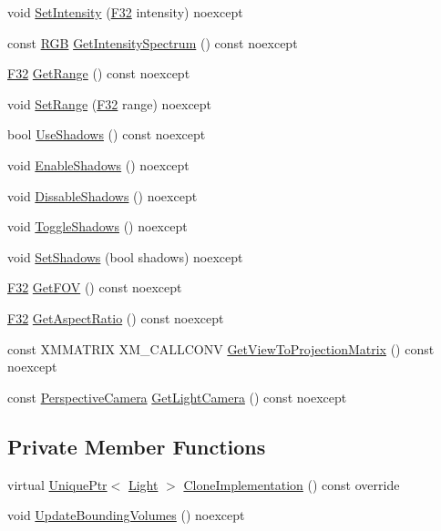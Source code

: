 \begin{DoxyCompactItemize}
void \hyperlink{classmage_1_1_omni_light_add3fece8f288f4d4b55357143faa490b}{Set\+Intensity} (\hyperlink{namespacemage_aa97e833b45f06d60a0a9c4fc22ae02c0}{F32} intensity) noexcept
\item 
const \hyperlink{structmage_1_1_r_g_b}{R\+GB} \hyperlink{classmage_1_1_omni_light_a89ce7086bd33e1d419dbd755316daf2e}{Get\+Intensity\+Spectrum} () const noexcept
\item 
\hyperlink{namespacemage_aa97e833b45f06d60a0a9c4fc22ae02c0}{F32} \hyperlink{classmage_1_1_omni_light_a1c829777c2afc850dd66382bc0115d8d}{Get\+Range} () const noexcept
\item 
void \hyperlink{classmage_1_1_omni_light_a696ec6a022ccc3993d88c1d435938fb1}{Set\+Range} (\hyperlink{namespacemage_aa97e833b45f06d60a0a9c4fc22ae02c0}{F32} range) noexcept
\item 
bool \hyperlink{classmage_1_1_omni_light_a8d58e7e1b26e54b3d9785ca79213cc4f}{Use\+Shadows} () const noexcept
\item 
void \hyperlink{classmage_1_1_omni_light_ad7c2e780dc83eb63fa44e1475492e192}{Enable\+Shadows} () noexcept
\item 
void \hyperlink{classmage_1_1_omni_light_a2353a53e336ffb55be9949ea6f1d8979}{Dissable\+Shadows} () noexcept
\item 
void \hyperlink{classmage_1_1_omni_light_a19164a13e884bce6fbc80b760c82d243}{Toggle\+Shadows} () noexcept
\item 
void \hyperlink{classmage_1_1_omni_light_a337082a4e6026fe6f98098df063e6660}{Set\+Shadows} (bool shadows) noexcept
\item 
\hyperlink{namespacemage_aa97e833b45f06d60a0a9c4fc22ae02c0}{F32} \hyperlink{classmage_1_1_omni_light_a7a0bd82c0272a7eeeb33a9ede796bae1}{Get\+F\+OV} () const noexcept
\item 
\hyperlink{namespacemage_aa97e833b45f06d60a0a9c4fc22ae02c0}{F32} \hyperlink{classmage_1_1_omni_light_a976a37c3f7c160f0383a93e4f7497eed}{Get\+Aspect\+Ratio} () const noexcept
\item 
const X\+M\+M\+A\+T\+R\+IX X\+M\+\_\+\+C\+A\+L\+L\+C\+O\+NV \hyperlink{classmage_1_1_omni_light_abae044c80634cfc6d15a0e21e7a55b5d}{Get\+View\+To\+Projection\+Matrix} () const noexcept
\item 
const \hyperlink{classmage_1_1_perspective_camera}{Perspective\+Camera} \hyperlink{classmage_1_1_omni_light_ac31708d7696a809bb75c75a85b14de80}{Get\+Light\+Camera} () const noexcept
\end{DoxyCompactItemize}
\subsection*{Private Member Functions}
\begin{DoxyCompactItemize}
\item 
virtual \hyperlink{namespacemage_a3316d7143a973e37adf1110f2e80ca31}{Unique\+Ptr}$<$ \hyperlink{classmage_1_1_light}{Light} $>$ \hyperlink{classmage_1_1_omni_light_a1212457828cdd96cc7170767b7bd1223}{Clone\+Implementation} () const override
\item 
void \hyperlink{classmage_1_1_omni_light_a6a10cdc0ed276d68e5378eaf934158e1}{Update\+Bounding\+Volumes} () noexcept
\end{DoxyCompactItemize}
